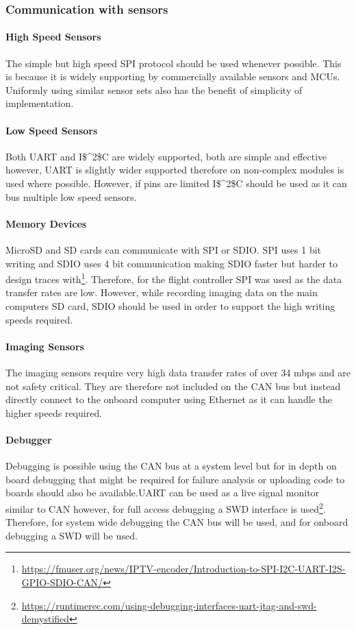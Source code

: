 \subsubsection{Communication with sensors}\label{sub_sub_section:tgt_comms_sensors}
\paragraph{High Speed Sensors}
The simple but high speed \gls{SPI} protocol should be used whenever possible. This is because it is widely supporting by commercially available sensors and \gls{MCU}s. Uniformly using similar sensor sets also has the benefit of simplicity of implementation.
\paragraph{Low Speed Sensors}
Both \gls{UART} and \gls{I$^2$C} are widely supported, both are simple and effective however, \gls{UART} is slightly wider supported therefore on non-complex modules is used where possible. However, if pins are limited \gls{I$^2$C} should be used as it can bus multiple low speed sensors.
\paragraph{Memory Devices}
MicroSD and SD cards can communicate with \gls{SPI} or \gls{SDIO}. \gls{SPI} uses 1 bit writing and \gls{SDIO} uses 4 bit communication making \gls{SDIO} faster but harder to design traces with\footnote{\url{https://fmuser.org/news/IPTV-encoder/Introduction-to-SPI-I2C-UART-I2S-GPIO-SDIO-CAN/}}. Therefore, for the flight controller \gls{SPI} was used as the data transfer rates are low. However, while recording imaging data on the main computers SD card, \gls{SDIO} should be used in order to support the high writing speeds required. 
\paragraph{Imaging Sensors}
The imaging sensors require very high data transfer rates of over 34 mbps and are not safety critical. They are therefore not included on the \gls{CAN} bus but instead directly connect to the onboard computer using Ethernet as it can handle the higher speeds required.
\paragraph{Debugger}
Debugging is possible using the \gls{CAN} bus at a system level but for in depth on board debugging that might be required for failure analysis or uploading code to boards should also be available.\gls{UART} can be used as a live signal monitor similar to CAN however, for full access debugging a \gls{SWD} interface is used\footnote{\url{https://runtimerec.com/using-debugging-interfaces-uart-jtag-and-swd-demystified}}. Therefore, for system wide debugging the \gls{CAN} bus will be used, and for onboard debugging a \gls{SWD} will be used.
